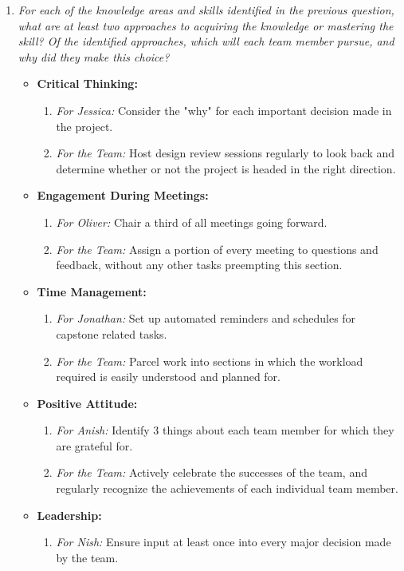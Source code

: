 \documentclass[12pt, titlepage]{article}
\begin{document}
\begin{enumerate}
  \item \textit{For each of the knowledge areas and skills identified in the previous
        question, what are at least two approaches to acquiring the knowledge or
        mastering the skill?  Of the identified approaches, which will each team
        member pursue, and why did they make this choice?}
	\begin{itemize}
	\item \textbf{Critical Thinking:}
		\begin{enumerate}
		\item \textit{For Jessica:} Consider the "why" for each important decision made in the project.
		\item \textit{For the Team:} Host design review sessions regularly to look back and determine whether or not the project is headed in the right direction.
		\end{enumerate}
	\item \textbf{Engagement During Meetings:}
		\begin{enumerate}
		\item \textit{For Oliver:} Chair a third of all meetings going forward.
		\item \textit{For the Team:} Assign a portion of every meeting to questions and feedback, without any other tasks preempting this section.
		\end{enumerate}
	\item \textbf{Time Management:}
		\begin{enumerate}
		\item \textit{For Jonathan:} Set up automated reminders and schedules for capstone related tasks.
		\item \textit{For the Team:} Parcel work into sections in which the workload required is easily understood and planned for.
		\end{enumerate}
	\item \textbf{Positive Attitude:}
		\begin{enumerate}
		\item \textit{For Anish:} Identify 3 things about each team member for which they are grateful for.
		\item \textit{For the Team:} Actively celebrate the successes of the team, and regularly recognize the achievements of each individual team member.
		\end{enumerate}
	\item \textbf{Leadership:}
		\begin{enumerate}
		\item \textit{For Nish:} Ensure input at least once into every major decision made by the team.

\end{enumerate}
\end{itemize}
\end{enumerate}
\end{document}
